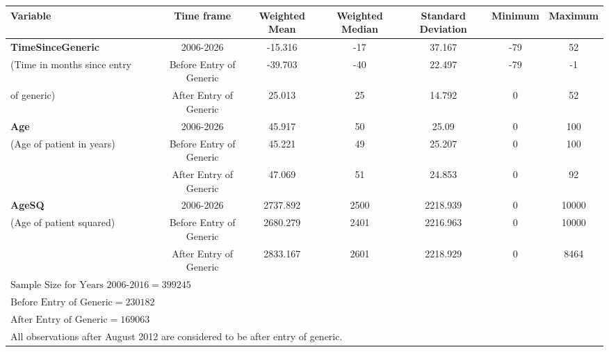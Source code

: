 \begin{tabular}{l*{6}{c}}
\hline\hline
            Variable&\multicolumn{1}{c}{Time frame}&\multicolumn{1}{c}{Weighted Mean}&\multicolumn{1}{c}{Weighted Median}&\multicolumn{1}{c}{Standard Deviation}&\multicolumn{1}{c}{Minimum}&\multicolumn{1}{c}{Maximum}\\
\hline
\textbf{TimeSinceGeneric}                    &     2006-2026&             -15.316&    -17&   37.167&     -79&  52\\
(Time in months since entry &     Before Entry of Generic&     -39.703&    -40&    22.497 &     -79&  -1\\
 of generic)   &     After Entry of Generic&       25.013 &    25&      14.792&     0&  52\\
[1em]
\textbf{Age}                                 &     2006-2026&             45.917&    50&    25.09 &     0&  100\\
(Age of patient in years)           &     Before Entry of Generic&     45.221&    49&    25.207&     0&  100\\
                                    &     After Entry of Generic&      47.069&    51&    24.853&     0&  92\\
[1em]
\textbf{AgeSQ}                               &     2006-2026&             2737.892&    2500&  2218.939&     0&  10000\\
(Age of patient squared)   &     Before Entry of Generic&    2680.279&    2401&  2216.963 &     0&  10000\\
                                    &     After Entry of Generic&      2833.167&    2601&  2218.929 &     0&  8464\\
\hline
$\text{Sample Size for Years 2006-2016} = 399245$\\
$\text{Before Entry of Generic} = 230182$\\
$\text{After Entry of Generic} = 169063$\\
\hline\hline
\multicolumn{4}{l}{\footnotesize All observations after August 2012 are considered to be after entry of generic.}\\
\end{tabular}
